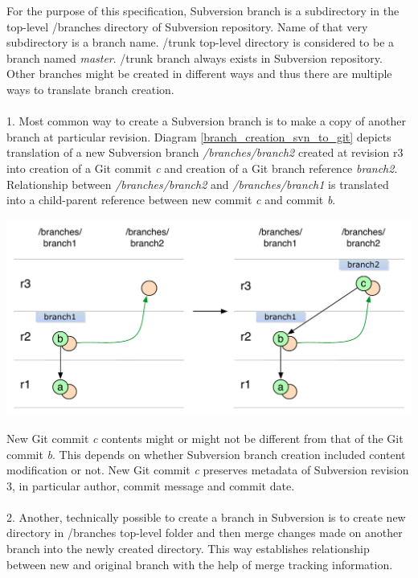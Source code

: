 For the purpose of this specification, Subversion branch is a subdirectory in the top-level /branches directory of
Subversion repository. Name of that very subdirectory is a branch name. /trunk top-level directory is considered to be a branch named \emph{master}.
/trunk branch always exists in Subversion repository. Other branches might be created in different ways and thus there are 
multiple ways to translate branch creation.
\\\\
1. Most common way to create a Subversion branch is to make a copy of another branch at particular revision.
Diagram \ref{branch_creation_svn_to_git} depicts translation of a new Subversion branch \emph{/branches/branch2} created 
at revision r3 into creation of a Git commit \emph{c} and creation of a Git branch reference \emph{branch2}. Relationship 
between \emph{/branches/branch2} and \emph{/branches/branch1} is translated into a child-parent reference between new commit \emph{c} and commit \emph{b}.
\begin{center}
\includegraphics[width=\textwidth]{img/diagrams/branch_creation_svn_to_git.pdf}%
\label{branch_creation_svn_to_git}%
\end{center}
New Git commit \emph{c} contents might or might not be different from that of the Git commit \emph{b}. 
This depends on whether Subversion branch creation included content modification or not. New Git commit
\emph{c} preserves metadata of Subversion revision 3, in particular author, commit message and commit date.
\\\\
2. Another, technically possible to create a branch in Subversion is to create new directory in /branches top-level
folder and then merge changes made on another branch into the newly created directory. This way
establishes relationship between new and original branch with the help of merge tracking information.
